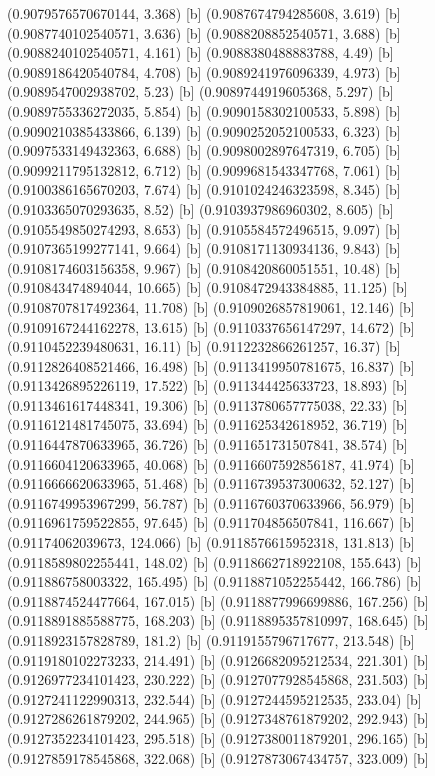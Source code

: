 {{{(0.9079576570670144, 3.368) [b] 
(0.9087674794285608, 3.619) [b] 
(0.9087740102540571, 3.636) [b] 
(0.9088208852540571, 3.688) [b] 
(0.9088240102540571, 4.161) [b] 
(0.9088380488883788, 4.49) [b] 
(0.9089186420540784, 4.708) [b] 
(0.9089241976096339, 4.973) [b] 
(0.9089547002938702, 5.23) [b] 
(0.9089744919605368, 5.297) [b] 
(0.9089755336272035, 5.854) [b] 
(0.9090158302100533, 5.898) [b] 
(0.9090210385433866, 6.139) [b] 
(0.9090252052100533, 6.323) [b] 
(0.9097533149432363, 6.688) [b] 
(0.9098002897647319, 6.705) [b] 
(0.9099211795132812, 6.712) [b] 
(0.9099681543347768, 7.061) [b] 
(0.9100386165670203, 7.674) [b] 
(0.9101024246323598, 8.345) [b] 
(0.9103365070293635, 8.52) [b] 
(0.9103937986960302, 8.605) [b] 
(0.9105549850274293, 8.653) [b] 
(0.9105584572496515, 9.097) [b] 
(0.9107365199277141, 9.664) [b] 
(0.9108171130934136, 9.843) [b] 
(0.9108174603156358, 9.967) [b] 
(0.9108420860051551, 10.48) [b] 
(0.910843474894044, 10.665) [b] 
(0.9108472943384885, 11.125) [b] 
(0.9108707817492364, 11.708) [b] 
(0.9109026857819061, 12.146) [b] 
(0.9109167244162278, 13.615) [b] 
(0.9110337656147297, 14.672) [b] 
(0.9110452239480631, 16.11) [b] 
(0.9112232866261257, 16.37) [b] 
(0.9112826408521466, 16.498) [b] 
(0.9113419950781675, 16.837) [b] 
(0.9113426895226119, 17.522) [b] 
(0.911344425633723, 18.893) [b] 
(0.9113461617448341, 19.306) [b] 
(0.9113780657775038, 22.33) [b] 
(0.9116121481745075, 33.694) [b] 
(0.911625342618952, 36.719) [b] 
(0.9116447870633965, 36.726) [b] 
(0.911651731507841, 38.574) [b] 
(0.9116604120633965, 40.068) [b] 
(0.9116607592856187, 41.974) [b] 
(0.9116666620633965, 51.468) [b] 
(0.9116739537300632, 52.127) [b] 
(0.9116749953967299, 56.787) [b] 
(0.9116760370633966, 56.979) [b] 
(0.9116961759522855, 97.645) [b] 
(0.911704856507841, 116.667) [b] 
(0.91174062039673, 124.066) [b] 
(0.9118576615952318, 131.813) [b] 
(0.9118589802255441, 148.02) [b] 
(0.9118662718922108, 155.643) [b] 
(0.911886758003322, 165.495) [b] 
(0.9118871052255442, 166.786) [b] 
(0.9118874524477664, 167.015) [b] 
(0.9118877996699886, 167.256) [b] 
(0.9118891885588775, 168.203) [b] 
(0.9118895357810997, 168.645) [b] 
(0.9118923157828789, 181.2) [b] 
(0.9119155796717677, 213.548) [b] 
(0.9119180102273233, 214.491) [b] 
(0.9126682095212534, 221.301) [b] 
(0.9126977234101423, 230.222) [b] 
(0.9127077928545868, 231.503) [b] 
(0.9127241122990313, 232.544) [b] 
(0.9127244595212535, 233.04) [b] 
(0.9127286261879202, 244.965) [b] 
(0.9127348761879202, 292.943) [b] 
(0.9127352234101423, 295.518) [b] 
(0.9127380011879201, 296.165) [b] 
(0.9127859178545868, 322.068) [b] 
(0.9127873067434757, 323.009) [b] 
}}}
